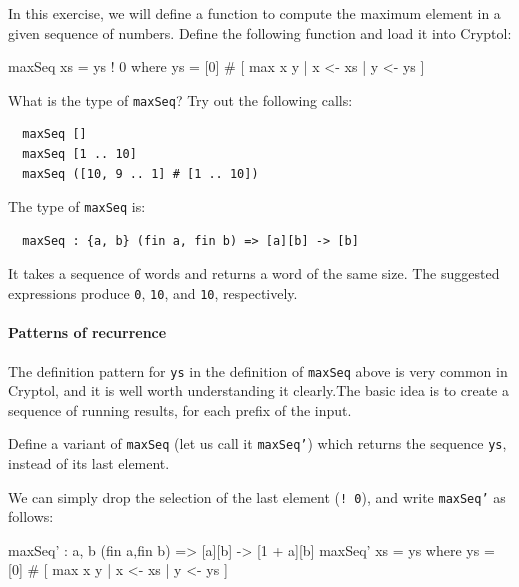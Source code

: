 \begin{Exercise}\label{ex:recfun:2}
  In this exercise, we will define a function to compute the maximum
  element in a given sequence of numbers.  Define the following
  function and load it into Cryptol:\indRIndex\indRecurrence\indMax
\begin{code}
  maxSeq xs = ys ! 0
      where ys = [0] # [ max x y | x <- xs
                                 | y <- ys
                       ]
\end{code}
What is the type of {\tt maxSeq}? Try out the following calls:
\begin{Verbatim}
  maxSeq []
  maxSeq [1 .. 10]
  maxSeq ([10, 9 .. 1] # [1 .. 10])
\end{Verbatim}
\end{Exercise}
\begin{Answer}
The type of {\tt maxSeq} is:
\begin{Verbatim}
  maxSeq : {a, b} (fin a, fin b) => [a][b] -> [b]
\end{Verbatim}
It takes a sequence of words and returns a word of the same size.  The
suggested expressions produce {\tt 0}, {\tt 10}, and {\tt 10},
respectively.
\end{Answer}

\paragraph*{Patterns of recurrence} The definition pattern for {\tt ys}
in the definition of {\tt maxSeq} above is very common in Cryptol, and
it is well worth understanding it clearly.\indRecurrence The basic
idea is to create a sequence of running results, for each prefix of
the input.

\begin{Exercise}\label{ex:recfun:3}
  Define a variant of {\tt maxSeq} (let us call it {\tt maxSeq'})
  which returns the sequence {\tt ys}, instead of its last element.
\end{Exercise}
\begin{Answer}
  We can simply drop the selection of the last element ({\tt ! 0}),
  and write {\tt maxSeq'} as follows:\indRIndex
\begin{code}
  maxSeq' : {a, b} (fin a,fin b) => [a][b] -> [1 + a][b]
  maxSeq' xs = ys
      where ys = [0] # [ max x  y | x <- xs
                                  | y <- ys
                       ]
\end{code}
\end{Answer}

